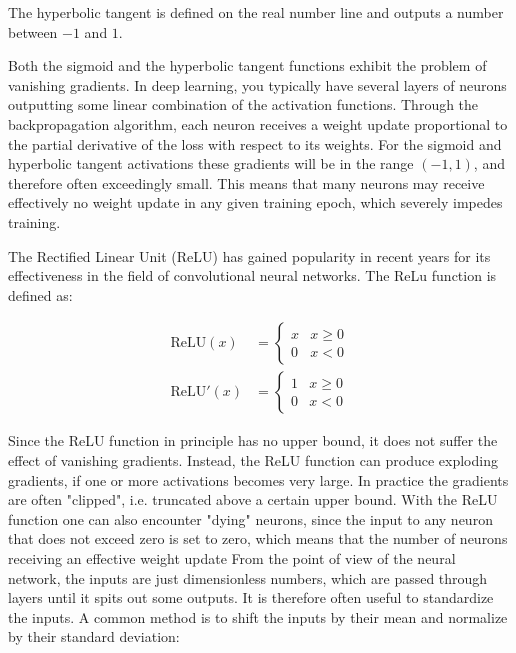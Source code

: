 The hyperbolic tangent is defined on the real number line and outputs
a number between $-1$ and $1$.
\par
Both the sigmoid and the hyperbolic tangent functions exhibit the problem
of vanishing gradients. In deep learning, you typically have several layers
of neurons outputting some linear combination of the activation functions.
Through the backpropagation algorithm, each neuron receives a weight update
proportional to the partial derivative of the loss with respect to
its weights. For the sigmoid and hyperbolic tangent activations these
gradients will be in the range $(-1, 1)$, and therefore often
exceedingly small. This means that many neurons may receive effectively
no weight update in any given training epoch, which severely impedes training.
\par
The Rectified Linear Unit (ReLU) has gained popularity in recent years
for its effectiveness in the field of convolutional neural networks.
The ReLu function is defined as:

\begin{equation}
    \begin{split}
        \text{ReLU}(x) &=
    \begin{cases}
        x & x \geq 0 \\
        0 & x < 0
    \end{cases} \\
        \text{ReLU}'(x) &=
    \begin{cases}
        1 & x \geq 0 \\
        0 & x < 0
    \end{cases}
    \end{split}
\end{equation}

Since the ReLU function in principle has no upper bound, it does
not suffer the effect of vanishing gradients. Instead, the ReLU function
can produce exploding gradients, if one or more activations becomes
very large. In practice the gradients are often "clipped", i.e.
truncated above a certain upper bound.
With the ReLU function one can also encounter "dying" neurons,
since the input to any neuron that does not exceed zero
is set to zero, which means that the number of neurons receiving
an effective weight update
\newline
\newline
From the point of view of the neural network, the inputs are just
dimensionless numbers, which are passed through layers until it spits
out some outputs. It is therefore often useful to standardize the inputs.
A common method is to shift the inputs by their mean and
normalize by their standard deviation:

